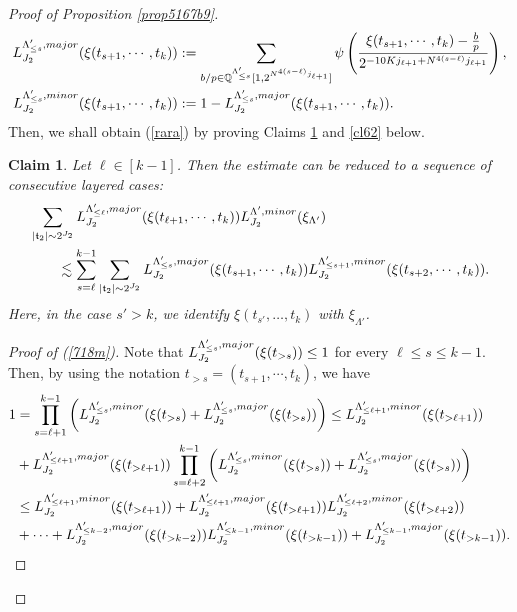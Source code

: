 \documentclass[10pt,a4paper]{amsart}
\newtheorem{claim}{Claim}\numberwithin{claim}{section}
\numberwithin{equation}{section}
\begin{document}
\begin{proof}[Proof of Proposition \ref{prop5167b9}]
\begin{align*} 
 L^{\Lambda_{\le s}',\rm{major}}_{J_2}(\xi(t_{s+1},\cdots,t_k) )&:=\sum_{b/p\in \mathbb{Q}^{\Lambda'_{\le s}}[1,2^{N^{4(s-\ell)}j_{\ell+1}} ]}\psi\left(\frac{\xi(t_{s+1},\cdots,t_k)-\frac{b}{p}}{ 2^{-10Kj_{\ell+1} +N^{4 (s-\ell)}j_{\ell+1}} }\right),\\
 L^{\Lambda_{\le s}',\rm{minor}}_{J_2}(\xi(t_{s+1},\cdots,t_k) )&:= 1-L^{\Lambda_{\le s}',\rm{major}}_{J_2}(\xi(t_{s+1},\cdots,t_k) ).\nonumber
\end{align*}
Then, we shall obtain (\ref{rara}) by proving Claims \ref{cl61} and \ref{cl62} below.
\begin{claim}\label{cl61} Let $ \ell \in [k-1]$. Then the estimate can be reduced to a sequence of consecutive layered cases:
\begin{align} \label{718m}
& \sum_{|\mathfrak{t}_{2}|\sim 2^{J_2}}  
L^{\Lambda_{\le \ell}',\rm{major}}_{J_2}(\xi(t_{\ell+1},\cdots,t_k) )L^{\Lambda',\rm{minor}}_{J_2}(\xi_{\Lambda'}) \\
&\qquad\lesssim  \sum_{s=\ell}^{k-1}  \sum_{|\mathfrak{t}_2|\sim 2^{J_2}} L^{\Lambda_{\le s}',\rm{major}}_{J_2}(\xi(t_{s+1},\cdots,t_k) )L^{\Lambda_{\le s+1}',\rm{minor}}_{J_2}(\xi(t_{s+2},\cdots,t_k) ).\nonumber
\end{align} 
Here, in the case $s' > k$, we identify $\xi(t_{s'}, \ldots, t_k)$ with $\xi_{\Lambda'}$.  
\end{claim}
\begin{proof}[Proof of (\ref{718m})]
Note that  $L^{\Lambda_{\le s}',\rm{major}}_{J_2}(\xi(t_{>s}) )\le 1$ for every $\ell\le s\le k-1$. Then, by using the notation $t_{>s}=(t_{s+1},\cdots,t_k)$,  we have
\begin{align*}
1&=\prod_{s=\ell+1}^{k-1}\left(L^{\Lambda_{\le s}',\rm{minor}}_{J_2}(\xi(t_{>s}) +L^{\Lambda_{\le s}',\rm{major}}_{J_2}(\xi(t_{>s}) )\right)  \le  L^{\Lambda_{\le \ell+1}',\rm{minor}}_{J_2}(\xi(t_{>\ell+1}) )\\
&+L^{\Lambda_{\le \ell+1}',\rm{major}}_{J_2}(\xi(t_{>\ell+1}) )\prod_{s=\ell+2}^{k-1}\left(L^{\Lambda_{\le s}',\rm{minor}}_{J_2}(\xi(t_{>s}) )+ L^{\Lambda_{\le s}',\rm{major}}_{J_2}(\xi(t_{>s}) )\right)\\
&\le L^{\Lambda_{\le \ell+1}',\rm{minor}}_{J_2}(\xi(t_{>\ell+1}) )+ L^{\Lambda_{\le \ell+1}',\rm{major}}_{J_2}(\xi(t_{>\ell+1}) )L^{\Lambda_{\le \ell+2}',\rm{minor}}_{J_2}(\xi(t_{>\ell+2}) )\\
&+\cdots+ L^{\Lambda_{\le k-2}',\rm{major}}_{J_2}(\xi(t_{>k-2}) )L^{\Lambda_{\le k-1}',\rm{minor}}_{J_2}(\xi(t_{>k-1}) )+ L^{\Lambda_{\le k-1}',\rm{major}}_{J_2}(\xi(t_{>k-1}) ).

\end{align*}
\end{proof}
\end{proof}
\end{document}
